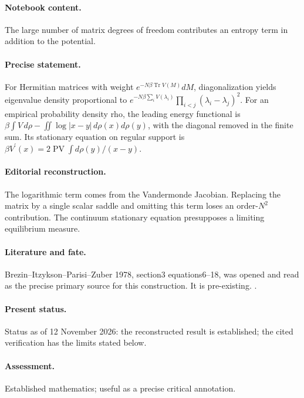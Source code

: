 \paragraph{Notebook content.} The large number of matrix degrees of freedom contributes an entropy term in addition to the potential.

\paragraph{Precise statement.} For Hermitian matrices with weight $e^{-N\beta\operatorname{Tr}V(M)}dM$, diagonalization yields eigenvalue density proportional to $e^{-N\beta\sum_iV(\lambda_i)}\prod_{i<j}(\lambda_i-\lambda_j)^2$. For an empirical probability density rho, the leading energy functional is $\beta\int V\,d\rho-\iint\log|x-y|\,d\rho(x)d\rho(y)$, with the diagonal removed in the finite sum. Its stationary equation on regular support is $\beta V^{\prime}(x)=2\operatorname{PV}\int d\rho(y)/(x-y)$.

\paragraph{Editorial reconstruction.} The logarithmic term comes from the Vandermonde Jacobian. Replacing the matrix by a single scalar saddle and omitting this term loses an order-$N^2$ contribution. The continuum stationary equation presupposes a limiting equilibrium measure.

\paragraph{Literature and fate.} Brezin--Itzykson--Parisi--Zuber 1978, section3 equations6--18, was opened and read as the precise primary source for this construction. It is pre-existing. \citep{brezinitzyksonparisizuber1978planar}.

\paragraph{Present status.} Status as of 12 November 2026: the reconstructed result is established; the cited verification has the limits stated below.

\paragraph{Assessment.} Established mathematics; useful as a precise critical annotation.

